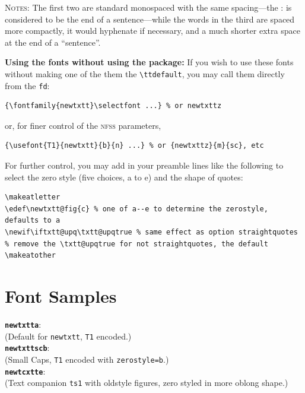 \documentclass[11pt]{article}
\begin{document}
\textsc{Notes:} The first two are standard monospaced with the same spacing---the : is considered to be the end of a sentence---while the words in the third are  spaced more compactly, it would hyphenate if necessary, and a much shorter extra space at the end of a ``sentence''.

\textbf{Using the fonts without using the package:} If you wish to use these fonts without making one of the them the \verb|\ttdefault|, you may call them directly from the {\tt fd}:
\begin{verbatim}
{\fontfamily{newtxtt}\selectfont ...} % or newtxttz
\end{verbatim}
or, for finer control of the \textsc{nfss} parameters,
\begin{verbatim}
{\usefont{T1}{newtxtt}{b}{n} ...} % or {newtxttz}{m}{sc}, etc
\end{verbatim}
For further control, you may add in your preamble lines like the following to select the zero style (five choices, a to e) and the shape of quotes:
\begin{verbatim}
\makeatletter
\edef\newtxtt@fig{c} % one of a--e to determine the zerostyle, defaults to a
\newif\iftxtt@upq\txtt@upqtrue % same effect as option straightquotes 
% remove the \txtt@upqtrue for not straightquotes, the default
\makeatother
\end{verbatim}
\newpage
\section*{Font Samples}
\textbf{\texttt{newtxtta}}:\\
(Default for {\tt newtxtt}, {\tt T1} encoded.)\\
\newpage
\textbf{\texttt{newtxttscb}}:\\
(Small Caps, {\tt T1} encoded with {\tt zerostyle=b}.)\\
\newpage
\textbf{\texttt{newtcxtte}}:\\
(Text companion {\tt ts1} with oldstyle figures, zero styled in more oblong shape.)\\
\end{document}
